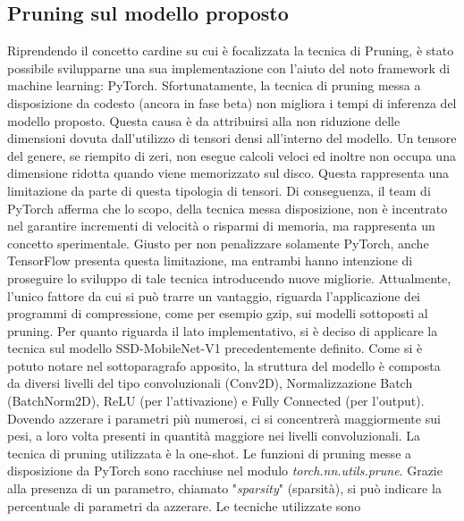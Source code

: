 \subsection{Pruning sul modello proposto}\label{pruning_model}
Riprendendo il concetto cardine su cui è focalizzata la tecnica di Pruning, è 
stato possibile svilupparne una sua implementazione con l'aiuto del noto 
framework di machine learning: PyTorch. Sfortunatamente, la tecnica di 
pruning messa a disposizione da codesto (ancora in fase beta) non migliora 
i tempi di inferenza del modello proposto. Questa causa è da attribuirsi alla 
non riduzione delle dimensioni dovuta dall'utilizzo di tensori densi all'interno 
del modello. Un tensore del genere, se riempito di zeri, non esegue calcoli 
veloci ed inoltre non occupa una dimensione ridotta quando viene memorizzato 
sul disco. Questa rappresenta una limitazione da parte di questa 
tipologia di tensori. Di conseguenza, il team di PyTorch afferma che lo scopo, 
della tecnica messa disposizione, non è incentrato nel garantire incrementi 
di velocità o risparmi di memoria, ma rappresenta un concetto sperimentale. 
Giusto per non penalizzare solamente PyTorch, anche TensorFlow presenta 
questa limitazione, ma entrambi hanno intenzione di proseguire lo sviluppo 
di tale tecnica introducendo nuove migliorie. Attualmente, l'unico fattore 
da cui si può trarre un vantaggio, riguarda l'applicazione dei programmi di 
compressione, come per esempio gzip, sui modelli sottoposti al pruning. Per 
quanto riguarda il lato implementativo, si è deciso di applicare la tecnica 
sul modello SSD-MobileNet-V1 precedentemente definito. Come si è potuto 
notare nel sottoparagrafo apposito, la struttura del modello è composta 
da diversi livelli del tipo convoluzionali (Conv2D), Normalizzazione Batch 
(BatchNorm2D), ReLU (per l'attivazione) e Fully Connected (per l'output). 
Dovendo azzerare i parametri più numerosi, ci si concentrerà maggiormente 
sui pesi, a loro volta presenti in quantità maggiore nei livelli convoluzionali. 
La tecnica di pruning utilizzata è la one-shot. Le funzioni di pruning messe 
a disposizione da PyTorch sono racchiuse nel modulo \emph{torch.nn.utils.prune}. 
Grazie alla presenza di un parametro, chiamato "\emph{sparsity}" (sparsità), si può 
indicare la percentuale di parametri da azzerare. Le tecniche utilizzate sono 
